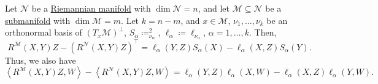 \begin{theorem}\label{thm:Gauss-equations}
	Let \(\mathcal{N} \) be a \hyperref[def:Riemannian-manifold]{Riemannian manifold} with \(\dim \mathcal{N} = n\), and let \(\mathcal{M} \subseteq \mathcal{N} \) be a \hyperref[def:submanifold]{submanifold} with \(\dim \mathcal{M} = m\). Let \(k = n - m\), and \(x\in \mathcal{M} \), \(\nu _1, \dots , \nu _k\) be an orthonormal basis of \((T_x \mathcal{M} )^{\perp} \), \(S_\alpha \coloneq^{2} _{\nu _\alpha }\), \(\ell _\alpha \coloneqq \ell _{\nu _\alpha }\), \(\alpha = 1, \dots , k\). Then,
	\[
		R^{\mathcal{M}}(X, Y)Z - \left( R^{\mathcal{N} } (X, Y)Z \right) ^{\top}
		= \ell _\alpha (Y, Z)S_\alpha (X) - \ell _\alpha (X, Z)S_{\alpha }(Y).
	\]
	Thus, we also have
	\[
		\left\langle R^{\mathcal{M} }(X, Y)Z, W \right\rangle - \left\langle R^{\mathcal{N} }(X, Y)Z, W \right\rangle
		= \ell _\alpha (Y, Z) \ell _\alpha (X, W) - \ell _\alpha (X, Z) \ell _\alpha (Y, W).
	\]
\end{theorem}
